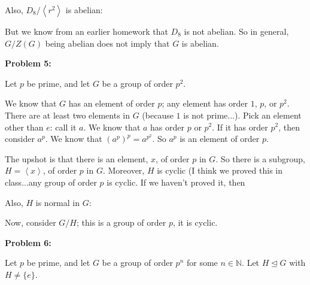 \documentclass[a4paper,12pt]{article}
\newcommand{\tab}{\hspace{4mm}} %
\newcommand{\shunt}{\vspace{20mm}}
\newcommand{\anbrack}[1]{\left\langle #1 \right\rangle}
\newcommand{\N}{\mathbb{N}}
\newcommand{\subgp}{\mathrel{\unlhd}}
\begin{document}
\tab \tab %

\tab Also, $D_8/\anbrack{r^2}$ is abelian:

\tab \tab %

\tab But we know from an earlier homework that $D_8$ is not abelian. So in general, $G/Z(G)$ being abelian does not imply that $G$ is abelian.

\shunt

{\bf Problem 5:}

Let $p$ be prime, and let $G$ be a group of order $p^2$.

We know that $G$ has an element of order $p$; any element has order $1$, $p$, or $p^2$. There are at least two elements in $G$ (because $1$ is not prime...). Pick an element other than $e$: call it $a$. We know that $a$ has order $p$ or $p^2$. If it has order $p^2$, then consider $a^p$. We know that $(a^p)^p = a^{p^2}$. So $a^p$ is an element of order $p$.

The upshot is that there is an element, $x$, of order $p$ in $G$. So there is a subgroup, $H=\anbrack{x}$, of order $p$ in $G$. Moreover, $H$ is cyclic (I think we proved this in class...any group of order $p$ is cyclic. If we haven't proved it, then %

Also, $H$ is normal in $G$: %

Now, consider $G/H$; this is a group of order $p$, it is cyclic.


\shunt

{\bf Problem 6:}

Let $p$ be prime, and let $G$ be a group of order $p^n$ for some $n \in \N$. Let $H \subgp G$ with $H \neq \{e\}$.

\shunt
\end{document}
